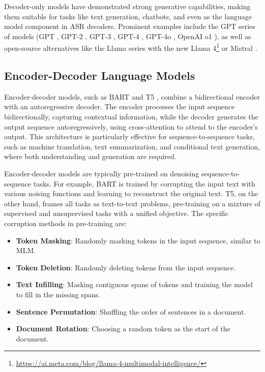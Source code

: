 Decoder-only models have demonstrated strong generative capabilities, making them suitable for tasks like text generation, chatbots, and even as the language model component in ASR decoders. Prominent examples include the GPT series of models (GPT \cite{radford2018improving}, GPT-2 \cite{radford2019language}, GPT-3 \cite{brown2020languagemodelsfewshotlearners}, GPT-4 \cite{openai2023gpt4}, GPT-4o \cite{openai2024gpt4o}, OpenAI o1 \cite{openai2024openai}), as well as open-source alternatives like the Llama series with the new Llama 4\footnote{\url{https://ai.meta.com/blog/llama-4-multimodal-intelligence/}} or Mistral \cite{jiang2023mistral}.


\subsection{Encoder-Decoder Language Models}
Encoder-decoder models, such as BART \cite{lewis2019bartdenoisingsequencetosequencepretraining} and T5 \cite{raffel2019exploring}, combine a bidirectional encoder with an autoregressive decoder. The encoder processes the input sequence bidirectionally, capturing contextual information, while the decoder generates the output sequence autoregressively, using cross-attention to attend to the encoder's output. This architecture is particularly effective for sequence-to-sequence tasks, such as machine translation, text summarization, and conditional text generation, where both understanding and generation are required.


Encoder-decoder models are typically pre-trained on denoising sequence-to-sequence tasks. For example, BART is trained by corrupting the input text with various noising functions and learning to reconstruct the original text. T5, on the other hand, frames all tasks as text-to-text problems, pre-training on a mixture of supervised and unsupervised tasks with a unified objective. The specific corruption methods in pre-training are:

\begin{itemize} \label{corupt_enum}
    \item \textbf{Token Masking}: Randomly masking tokens in the input sequence, similar to MLM.
    \item \textbf{Token Deletion}: Randomly deleting tokens from the input sequence.
    \item \textbf{Text Infilling}: Masking contiguous spans of tokens and training the model to fill in the missing spans.
    \item \textbf{Sentence Permutation}: Shuffling the order of sentences in a document.
    \item \textbf{Document Rotation}: Choosing a random token as the start of the document.
\end{itemize}

